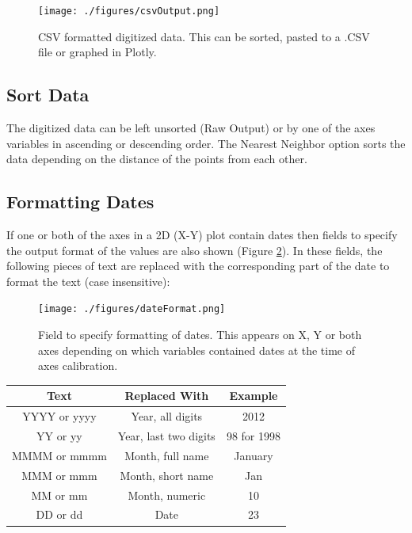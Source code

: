 \documentclass[letterpaper, 10pt]{article}
\begin{document}
\begin{figure}
\begin{center}
\texttt{[image: ./figures/csvOutput.png]}
\caption{CSV formatted digitized data. This can be sorted, pasted to a .CSV file or graphed in Plotly.}
\label{fig:csvOutput}
\end{center}
\end{figure}
\subsection{Sort Data}
The digitized data can be left unsorted (Raw Output) or by one of the axes variables in ascending or descending order. The Nearest Neighbor option sorts the data depending on the distance of the points from each other.
\subsection{Formatting Dates}
\label{sec:formattingDatesCSV}
If one or both of the axes in a 2D (X-Y) plot contain dates then fields to specify the output format of the values are also shown (Figure \ref{fig:dateFormat}). In these fields, the following pieces of text are replaced with the corresponding part of the date to format the text (case insensitive):
\begin{figure}
\begin{center}
\texttt{[image: ./figures/dateFormat.png]}
\caption{Field to specify formatting of dates. This appears on X, Y or both axes depending on which variables contained dates at the time of axes calibration.}
\label{fig:dateFormat}
\end{center}
\end{figure}


\begin{center}
\begin{tabular}{|c|c|c|}
\hline
Text & Replaced With & Example\\
\hline
YYYY or yyyy & Year, all digits & 2012\\
YY or yy & Year, last two digits & 98 for 1998\\
MMMM or mmmm & Month, full name & January\\
MMM or mmm & Month, short name & Jan\\
MM or mm & Month, numeric & 10\\
DD or dd & Date & 23\\
\hline
\end{tabular}
\end{center}
\end{document}
